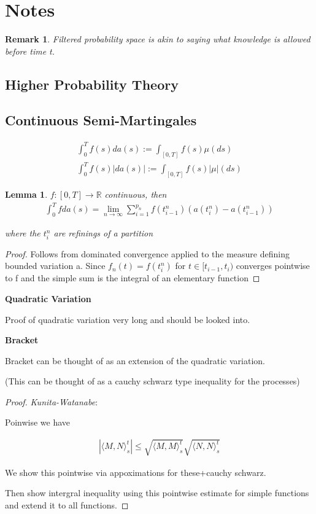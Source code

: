 \documentclass[11pt]{article}
\newcommand{\R}{\mathbb{R}}
\newtheorem{lemma}{Lemma}
\newtheorem{remark}{Remark}
\begin{document}
\section{Notes}

\begin{remark}
	Filtered probability space is akin to saying what knowledge is allowed before time t.
\end{remark}

\subsection{Higher Probability Theory}


\subsection{Continuous Semi-Martingales}

\begin{align*}
	\int_0^T f(s) da(s) := \int_{[0,T]} f(s) \mu(ds)\\
	\int_0^T f(s) |da(s)| := \int_{[0,T]} f(s) |\mu|(ds)
\end{align*}

\begin{lemma}
$f : [0,T] \to \R$ continuous, then
\begin{align*}
	\int_0^T f da(s) = \lim_{n \to \infty}\sum_{i=1}^{p_n} f(t_{i-1}^n)(a(t_i^n) - a(t_{i-1}^n))
\end{align*}

where the $t_i^n$ are refinings of a partition
\end{lemma}

\begin{proof}
	Follows from dominated convergence applied to the measure defining bounded variation a. Since $f_n(t) = f(t_{i}^n)$ for $t \in [t_{i-1},t_i)$ converges pointwise to f and the simple sum is the integral of an elementary function
	\end{proof}

\textbf{Quadratic Variation}

Proof of quadratic variation very long and should be looked into.

\textbf{Bracket}

Bracket can be thought of as an extension of the quadratic variation.

(This can be thought of as a cauchy schwarz type inequality for the processes)
\begin{proof}
\textit{Kunita-Watanabe}:

Poinwise we have 

\begin{align*}
	|\langle M, N \rangle_s^t| \leq \sqrt{\langle M,M \rangle_s^t}\sqrt{\langle N,N \rangle_s^t}
\end{align*}

We show this pointwise via appoximations for these+cauchy schwarz.

Then show intergral inequality using this pointwise estimate for simple functions and extend it to all functions.

\end{proof}
\end{document}
